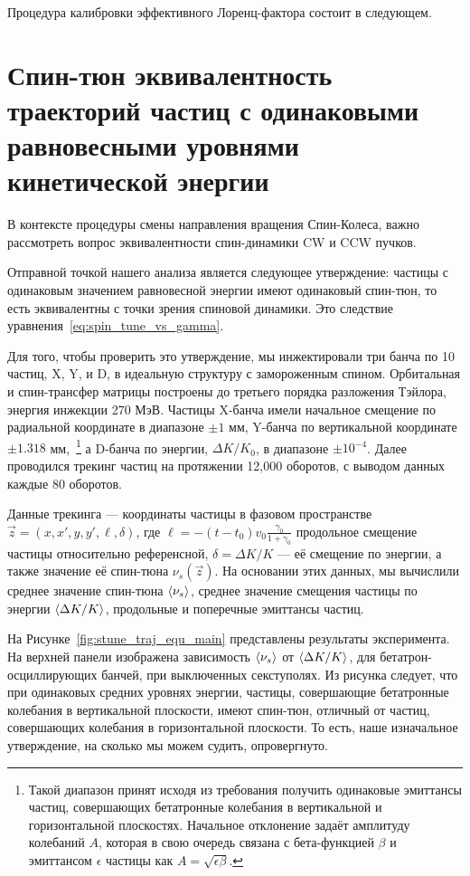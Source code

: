 Процедура калибровки эффективного Лоренц-фактора состоит в следующем.



\section{Спин-тюн эквивалентность траекторий частиц с одинаковыми равновесными уровнями кинетической энергии}\label{sec:spin_tune_traj_equivalence}
В контексте процедуры смены направления вращения Спин-Колеса, важно рассмотреть вопрос эквивалентности спин-динамики CW и CCW пучков. 

Отправной точкой нашего анализа является следующее утверждение: частицы с одинаковым значением равновесной энергии имеют одинаковый спин-тюн, то есть эквивалентны с точки зрения спиновой динамики. Это следствие уравнения~\eqref{eq:spin_tune_vs_gamma}. 

Для того, чтобы проверить это утверждение, мы инжектировали три банча по 10 частиц, X, Y, и D, в идеальную структуру с замороженным спином. Орбитальная и спин-трансфер матрицы построены до третьего порядка разложения Тэйлора, энергия инжекции 270 МэВ. Частицы X-банча имели начальное смещение по радиальной координате в диапазоне $\pm 1$ мм, Y-банча по вертикальной координате $\pm 1.318$ мм,~\footnote{Такой диапазон принят исходя из требования получить одинаковые эмиттансы частиц, совершающих бетатронные колебания в вертикальной и горизонтальной плоскостях. Начальное отклонение задаёт амплитуду колебаний $A$, которая в свою очередь связана с бета-функцией  $\beta$ и эмиттансом $\epsilon$ частицы как $A = \sqrt{\epsilon \beta}$. } а D-банча по энергии,  $\Delta K/K_0$, в диапазоне $\pm 10^{-4}$. Далее проводился трекинг частиц на протяжении 12,000 оборотов, с выводом данных каждые 80 оборотов. 

Данные трекинга --- координаты частицы в фазовом пространстве $\vec z = (x,x',y,y',\ell, \delta)$, где $\ell = -(t-t_0)v_0\frac{\gamma_0}{1+\gamma_0}$ продольное смещение частицы относительно референсной, $\delta = \Delta K/K$ --- её смещение по энергии, а также значение её спин-тюна $\nu_s(\vec z)$. На основании этих данных, мы вычислили среднее значение спин-тюна $\avg{\nu_s}$, среднее значение смещения частицы по энергии $\avg{\Delta K/K}$, продольные и поперечные эмиттансы частиц.

На Рисунке~\ref{fig:stune_traj_equ_main} представлены результаты эксперимента. На верхней панели изображена зависимость $\avg{\nu_s}$ от $\avg{\Delta K/K}$, для бетатрон-осциллирующих банчей, при выключенных секступолях. Из рисунка следует, что при одинаковых средних уровнях энергии, частицы, совершающие бетатронные колебания в вертикальной плоскости, имеют спин-тюн, отличный от частиц, совершающих колебания в горизонтальной плоскости. То есть, наше изначальное утверждение, на сколько мы можем судить, опровергнуто.

